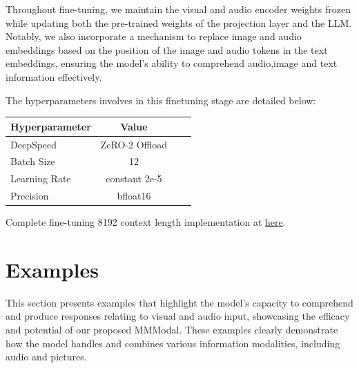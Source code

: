 \documentclass[preprint]{article}
\begin{document}
Throughout fine-tuning, we maintain the visual and audio encoder weights frozen while updating both the pre-trained weights of the projection layer and the LLM. Notably, we also incorporate a mechanism to replace image and audio embeddings based on the position of the image and audio tokens in the text embeddings, ensuring the model's ability to comprehend audio,image and text information effectively.

The hyperparameters involves in this finetuning stage are detailed below:

\begin{table}[h]
  \centering
  \begin{tabular}{lccl}
    \hline
    \textbf{Hyperparameter} & \textbf{Value} \\
    \hline
    DeepSpeed               & ZeRO-2 Offload \\
    Batch Size              & 12             \\
    Learning Rate           & constant 2e-5  \\
    Precision               & bfloat16       \\
    \hline
  \end{tabular}
\end{table}

Complete fine-tuning 8192 context length implementation at \href{https://github.com/mesolitica/multimodal-LLM/blob/master/run-deepspeed.sh}{here}.

\section{Examples}

This section presents examples that highlight the model's capacity to comprehend and produce responses relating to visual and audio input, showcasing the efficacy and potential of our proposed MMModal. These examples clearly demonstrate how the model handles and combines various information modalities, including audio and pictures.
\end{document}

